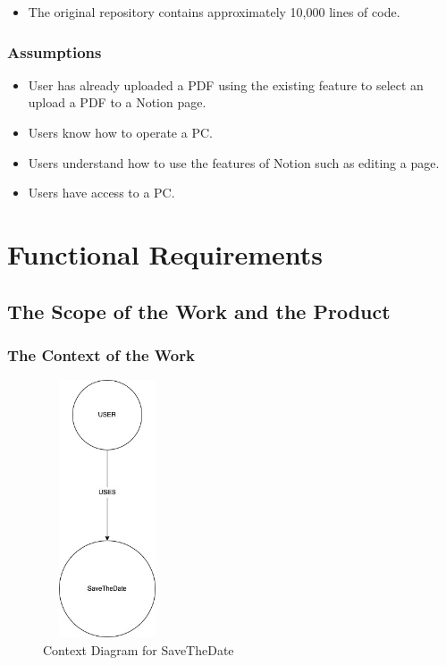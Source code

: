\documentclass[12pt, titlepage]{article}
\begin{document}
\begin{itemize}
\item The original repository contains approximately 10,000 lines of code. 
\end{itemize}

\subsubsection{Assumptions}

\begin{itemize}
\item User has already uploaded a PDF using the existing feature to select an upload a PDF to a Notion page. 
\item Users know how to operate a PC.
\item Users understand how to use the features of Notion such as editing a page.
\item Users have access to a PC.
\end{itemize}

\pagebreak

\section{Functional Requirements}

\subsection{The Scope of the Work and the Product}

\subsubsection{The Context of the Work}

  \begin{figure}[!hb]
    \centerline{\includegraphics[width=1.5in, height=3in]{images/context_diagram.jpg}}
    \caption{Context Diagram for SaveTheDate}
  \end{figure}
\end{document}
